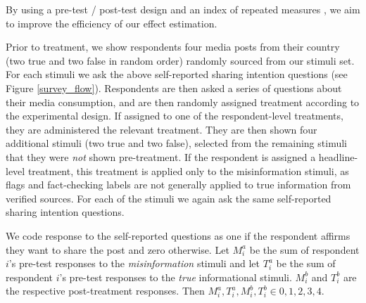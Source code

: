 \documentclass[letterpaper, 12pt, parskip=full,]{scrartcl}
\begin{document}
By using a pre-test / post-test design  \citep{davidian2005semiparametric} %
and an index of repeated measures \citep{broockman2017design}, we aim to improve the efficiency of our effect estimation. 



Prior to treatment, we show respondents four media posts from their country (two true and two false in random order) randomly sourced from our stimuli set. For each stimuli we ask the above self-reported sharing intention questions (see Figure \ref{survey_flow}). Respondents are then asked a series of questions about their media consumption, and are then randomly assigned treatment according to the experimental design. If assigned to one of the respondent-level treatments, they are administered the relevant treatment. They are then shown four additional stimuli (two true and two false), selected from the remaining stimuli that they were \textit{not} shown pre-treatment. If the respondent is assigned a headline-level treatment, this treatment is applied only to the misinformation stimuli, as flags and fact-checking labels are not generally applied to true information from verified sources. For each of the stimuli we again ask the same self-reported sharing intention questions. 



We code response to the self-reported questions as one if the respondent affirms they want to share the post and zero otherwise. Let $M_i^a$ be the sum of respondent $i$'s pre-test responses to the \textit{misinformation} stimuli and let $T_i^a$ be the sum of respondent $i$'s pre-test responses to the \textit{true} informational stimuli. $M_i^b$ and $T_i^b$ are the respective post-treatment responses. Then $M_i^a, T_i^a, M_i^b, T_i^b \in {0,1,2, 3, 4}$. 
\end{document}
